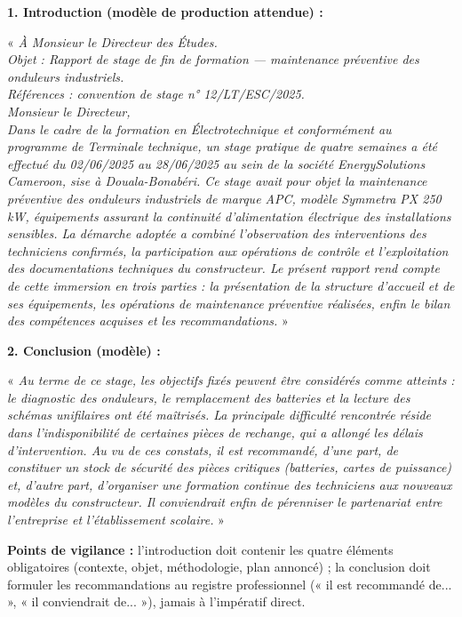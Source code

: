 \documentclass[11pt]{article}
\begin{document}
\begin{corrige}
\textbf{1. Introduction (modèle de production attendue) :}

« \emph{À Monsieur le Directeur des Études.\\
Objet : Rapport de stage de fin de formation — maintenance préventive des onduleurs industriels.\\
Références : convention de stage n° 12/LT/ESC/2025.\\
Monsieur le Directeur,\\
Dans le cadre de la formation en Électrotechnique et conformément au programme de Terminale technique, un stage pratique de quatre semaines a été effectué du 02/06/2025 au 28/06/2025 au sein de la société EnergySolutions Cameroon, sise à Douala-Bonabéri. Ce stage avait pour objet la maintenance préventive des onduleurs industriels de marque APC, modèle Symmetra PX 250 kW, équipements assurant la continuité d'alimentation électrique des installations sensibles. La démarche adoptée a combiné l'observation des interventions des techniciens confirmés, la participation aux opérations de contrôle et l'exploitation des documentations techniques du constructeur. Le présent rapport rend compte de cette immersion en trois parties : la présentation de la structure d'accueil et de ses équipements, les opérations de maintenance préventive réalisées, enfin le bilan des compétences acquises et les recommandations.} »

\textbf{2. Conclusion (modèle) :}

« \emph{Au terme de ce stage, les objectifs fixés peuvent être considérés comme atteints : le diagnostic des onduleurs, le remplacement des batteries et la lecture des schémas unifilaires ont été maîtrisés. La principale difficulté rencontrée réside dans l'indisponibilité de certaines pièces de rechange, qui a allongé les délais d'intervention. Au vu de ces constats, il est recommandé, d'une part, de constituer un stock de sécurité des pièces critiques (batteries, cartes de puissance) et, d'autre part, d'organiser une formation continue des techniciens aux nouveaux modèles du constructeur. Il conviendrait enfin de pérenniser le partenariat entre l'entreprise et l'établissement scolaire.} »

\textbf{Points de vigilance :} l'introduction doit contenir les quatre éléments obligatoires (contexte, objet, méthodologie, plan annoncé) ; la conclusion doit formuler les recommandations au registre professionnel (« il est recommandé de... », « il conviendrait de... »), jamais à l'impératif direct.
\end{corrige}
\end{document}
